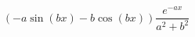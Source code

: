 \begin{displaymath}
 \left( -a\sin(bx) - b\cos(bx)\right) \frac{e^{-ax}}{a^2+b^2}
\end{displaymath}
